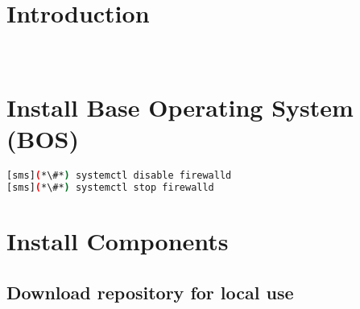 \documentclass[letterpaper]{article}
\begin{document}
\graphicspath{{common/figures/}}
\thispagestyle{empty}


 

\newpage
\tableofcontents
\newpage


\section{Introduction} \label{sec:introduction}

 \\








\section{Install Base Operating System (BOS)}


\begin{lstlisting}[language=bash,keywords={}]
[sms](*\#*) systemctl disable firewalld
[sms](*\#*) systemctl stop firewalld
\end{lstlisting}


\section{Install \OHPC{} Components} \label{sec:basic_install}


\subsection{Download \OHPC{} repository for local use} \label{sec:enable_repo}

\end{document}
